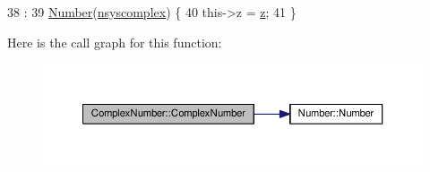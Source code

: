 \begin{DoxyCode}
38                                       :
39     \hyperlink{structNumber_afd3c2f9b4b288e339f741a6e4ae54593}{Number}(\hyperlink{numb_8h_a1475a201d2346881ce88dfbacf628c7da3b38c947375a3db3a4bc184a11c8ee42}{nsyscomplex}) \{
40     this->z = \hyperlink{structComplexNumber_a5f72da71f4ce0d88076a391369239042}{z};
41 \}
\end{DoxyCode}


Here is the call graph for this function\+:\nopagebreak
\begin{figure}[H]
\begin{center}
\leavevmode
\includegraphics[width=350pt]{structComplexNumber_a0d89581ead93385331befcef51698693_cgraph}
\end{center}
\end{figure}




